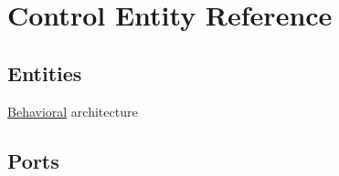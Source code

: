 \hypertarget{class_control}{\section{\-Control \-Entity \-Reference}
\label{class_control}
}
\subsection*{\-Entities}
\begin{DoxyCompactItemize}
\item 
\hyperlink{class_control_1_1_behavioral}{\-Behavioral} architecture
\end{DoxyCompactItemize}
\*
\*
\subsection*{\-Ports}
